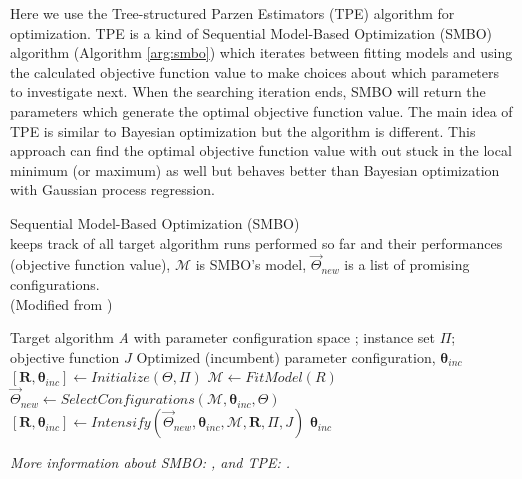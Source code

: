 Here we use the Tree-structured Parzen Estimators (TPE) algorithm for optimization. 
TPE is a kind of Sequential Model-Based Optimization (SMBO) algorithm (Algorithm \ref{arg:smbo}) which iterates between fitting models and using the calculated objective function value to make choices about which parameters to investigate next.
When the searching iteration ends, SMBO will return the parameters which generate the optimal objective function value.
The main idea of TPE is similar to Bayesian optimization but the algorithm is different.
This approach can find the optimal objective function value with out stuck in the local minimum (or maximum) as well but behaves better than Bayesian optimization with Gaussian process regression.

\begin{algorithm}
    \caption{
        Sequential Model-Based Optimization (SMBO) \\
         keeps track of all target algorithm runs performed so far and their performances (objective function value), 
        $\mathcal{M}$ is SMBO's model, 
        $\bm{\vec{\varTheta }}_{new}$ is a list of promising configurations. \\
        (Modified from \citep{hutter2011sequential})
        }
    \label{arg:smbo}
    \begin{algorithmic}[1]
        \REQUIRE Target algorithm \textit{A} with parameter configuration space \bm{$\varTheta$}; instance set
        $\varPi$; objective function $J$
        \ENSURE Optimized (incumbent) parameter configuration, $\bm{\theta}_{inc}$
        \STATE $[\bm{R}, \bm{\theta}_{inc}] \leftarrow Initialize(\bm{\varTheta}, \varPi)$
        \REPEAT 
            \STATE $\mathcal{M} \leftarrow FitModel(R)$
            \STATE $\bm{\vec{\varTheta}}_{new} \leftarrow SelectConfigurations(\mathcal{M}, \bm{\theta}_{inc}, \bm{\varTheta})$
            \STATE $[\bm{R}, \bm{\theta}_{inc}] \leftarrow Intensify(\bm{\vec{\varTheta}}_{new}, \bm{\theta}_{inc}, \mathcal{M}, \bm{R}, \varPi, J)$
        \RETURN $\bm{\theta}_{inc}$
    \end{algorithmic}
\end{algorithm}

\textit{
    More information about SMBO: \citep{hutter2011sequential}, 
    and TPE: \citep{bergstra2011algorithms}.
}
